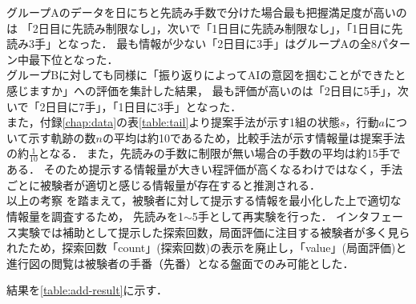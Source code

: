 グループAのデータを日にちと先読み手数で分けた場合最も把握満足度が高いのは
「2日目に先読み制限なし」，次いで「1日目に先読み制限なし」，「1日目に先読み3手」となった．
最も情報が少ない「2日目に3手」はグループAの全8パターン中最下位となった．\\


グループBに対しても同様に「振り返りによってAIの意図を掴むことができたと感じますか」への評価を集計した結果，
最も評価が高いのは「2日目に5手」，次いで「2日目に7手」，「1日目に3手」となった．\\



また，付録\ref{chap:data}の表\ref{table:tail}より提案手法が示す1組の状態$s$，行動$a$について示す軌跡の数$n$の平均は約10であるため，比較手法が示す情報量は提案手法の約$\frac{1}{10}$となる．
また，先読みの手数に制限が無い場合の手数の平均は約15手である．
そのため提示する情報量が大きい程評価が高くなるわけではなく，手法ごとに被験者が適切と感じる情報量が存在すると推測される．\\

以上の考察
を踏まえて，被験者に対して提示する情報を最小化した上で適切な情報量を調査するため，
先読みを1$\sim$5手として再実験を行った．
インタフェース実験では補助として提示した探索回数，局面評価に注目する被験者が多く見られたため，探索回数「count」(探索回数)の表示を廃止し，「value」(局面評価)と進行図の閲覧は被験者の手番（先番）となる盤面でのみ可能とした．

結果を\ref{table:add-result}に示す．

\begin{table}[H]
    \caption{先読み手数制限なしの場合(追加実験)}
    \label{table:add-result}
    \scriptsize
    \centering
    
\end{table}


